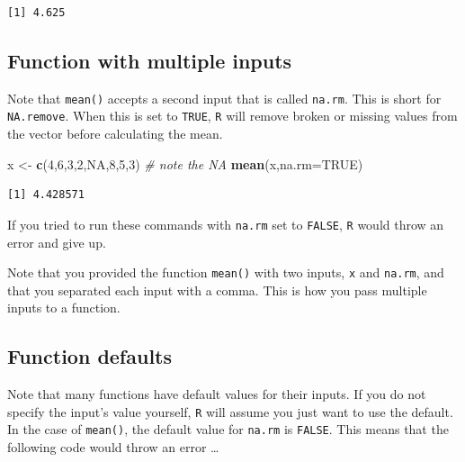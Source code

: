 \documentclass[
]{book}
\newenvironment{Shaded}{\begin{snugshade}}{\end{snugshade}}
\newcommand{\CommentTok}[1]{\textcolor[rgb]{0.56,0.35,0.01}{\textit{#1}}}
\newcommand{\DataTypeTok}[1]{\textcolor[rgb]{0.13,0.29,0.53}{#1}}
\newcommand{\DecValTok}[1]{\textcolor[rgb]{0.00,0.00,0.81}{#1}}
\newcommand{\KeywordTok}[1]{\textcolor[rgb]{0.13,0.29,0.53}{\textbf{#1}}}
\newcommand{\NormalTok}[1]{#1}
\newcommand{\OtherTok}[1]{\textcolor[rgb]{0.56,0.35,0.01}{#1}}
\newcommand{\StringTok}[1]{\textcolor[rgb]{0.31,0.60,0.02}{#1}}
\begin{document}
\begin{verbatim}
[1] 4.625
\end{verbatim}

\hypertarget{function-with-multiple-inputs}{%
\subsection*{Function with multiple inputs}\label{function-with-multiple-inputs}}

Note that \texttt{mean()} accepts a second input that is called \texttt{na.rm}. This is short for \texttt{NA.remove}. When this is set to \texttt{TRUE}, \texttt{R} will remove broken or missing values from the vector before calculating the mean.

\begin{Shaded}
\begin{Highlighting}[]
\NormalTok{x <-}\StringTok{ }\KeywordTok{c}\NormalTok{(}\DecValTok{4}\NormalTok{,}\DecValTok{6}\NormalTok{,}\DecValTok{3}\NormalTok{,}\DecValTok{2}\NormalTok{,}\OtherTok{NA}\NormalTok{,}\DecValTok{8}\NormalTok{,}\DecValTok{5}\NormalTok{,}\DecValTok{3}\NormalTok{)  }\CommentTok{# note the NA}
\KeywordTok{mean}\NormalTok{(x,}\DataTypeTok{na.rm=}\OtherTok{TRUE}\NormalTok{)}
\end{Highlighting}
\end{Shaded}

\begin{verbatim}
[1] 4.428571
\end{verbatim}

If you tried to run these commands with \texttt{na.rm} set to \texttt{FALSE}, \texttt{R} would throw an error and give up.

Note that you provided the function \texttt{mean()} with two inputs, \texttt{x} and \texttt{na.rm}, and that you separated each input with a comma. This is how you pass multiple inputs to a function.

\hypertarget{function-defaults}{%
\subsection*{Function defaults}\label{function-defaults}}

Note that many functions have default values for their inputs. If you do not specify the input's value yourself, \texttt{R} will assume you just want to use the default. In the case of \texttt{mean()}, the default value for \texttt{na.rm} is \texttt{FALSE}. This means that the following code would throw an error \ldots{}
\end{document}
